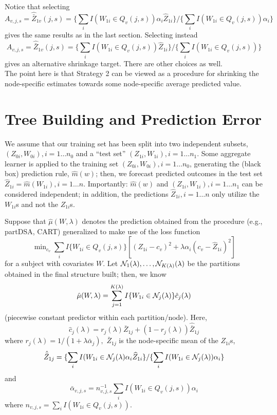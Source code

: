 \documentclass[12pt]{article}
\begin{document}
Notice that selecting
\[
A_{v,j,s} = \hat{\bar{Z}}_{1v}(j,s) =
\{ \sum_i I(W_{1i} \in Q_{v}(j,s)) \alpha_i  \hat{Z}_{1i} \}
/ \{ \sum_i I(W_{1i} \in Q_{v}(j,s)) \alpha_i \}
\]
gives the same results as in the last section. Selecting instead
\[
A_{v,j,s} = \hat{\bar{Z}}_{1v}(j,s) =
\{ \sum_i I(W_{1i} \in Q_{v}(j,s))  \hat{Z}_{1i} \}
/ \{ \sum_i I(W_{1i} \in Q_{v}(j,s))  \}
\]
gives an alternative shrinkage target.  There are other choices as well.\\

The point here is that Strategy 2 can be viewed as a procedure for shrinking the node-specific estimates towards some node-specific average predicted value.

\section{Tree Building and Prediction Error}
\label{PE}

We assume that our training set has been split into two independent subsets,
$(Z_{0i},W_{0i}), i = 1 \ldots n_0$ and a ``test set'' $(Z_{1i}, W_{1i}), i = 1
\ldots n_1$. Some aggregate learner is applied to 
the training set $(Z_{0i}, W_{0i}), i = 1 \ldots
n_0$, generating the (black box) prediction rule, $\hat{m}(w)$; then,
we forecast predicted outcomes in the test set $\widehat{Z}_{1i} =
\hat{m}(W_{1i}), i = 1 \ldots n$.  Importantly: $\hat{m}(w)$ and
$(Z_{1i}, W_{1i}), i = 1 \ldots n_1$ can be considered independent; in
addition, the predictions $\widehat{Z}_{1i}, i = 1 \ldots n$ only
utilize the $W_{1i}$s and not the $Z_{1i}$s. 

Suppose that $\hat{\mu}(W,\lambda)$ denotes the prediction
obtained from the procedure (e.g., partDSA, CART) generalized
to make use of the loss function
\[
\min\nolimits_{c_v} {\textstyle \sum\nolimits}_i I\{W_{1i} \in Q_{v}(j,s)\} \left[ (Z_{1i}-c_v)^2 +
\lambda \alpha_i (c_v-\widehat{Z}_{1i})^2 \right]
\]
for a subject with covariates $W$.
Let ${\cal N}_1(\lambda), \ldots, {\cal N}_{K(\lambda)}(\lambda)$ be the
partitions obtained in the final structure built; then, we know
\[
\hat{\mu}(W,\lambda) = \sum_{j=1}^{K(\lambda)} I\{W_{1i} \in {\cal N}_j(\lambda)\} \hat c_j(\lambda)
\]
(piecewise constant predictor within each partition/node).  Here,
 \[
\hat{c}_{j}(\lambda) =
r_{j}(\lambda) \bar{Z}_{1j} + (1-r_j(\lambda)) \hat{\bar{Z}}_{1j}
\]
where $r_j(\lambda) = 1/(1 + \lambda \bar{\alpha}_j),$ $\bar{Z}_{1j}$ is the node-specific mean
of the $Z_{1i}$s,
\[
\hat{\bar{Z}}_{1j}=
\{ \sum_i I(W_{1i} \in {\cal N}_j(\lambda) \alpha_i  \widehat{Z}_{1i}  \}
/ \{ \sum_i I(W_{1i} \in {\cal N}_j(\lambda)) \alpha_i \}
\]
and
\[
\bar{\alpha}_{v,j,s} =  n^{-1}_{v,j,s} \sum_i I(W_{1i} \in Q_{v}(j,s)) \alpha_i
\]
where $n_{v,j,s} =  \sum_i I( W_{1i} \in Q_{v}(j,s) ).$
\end{document}
